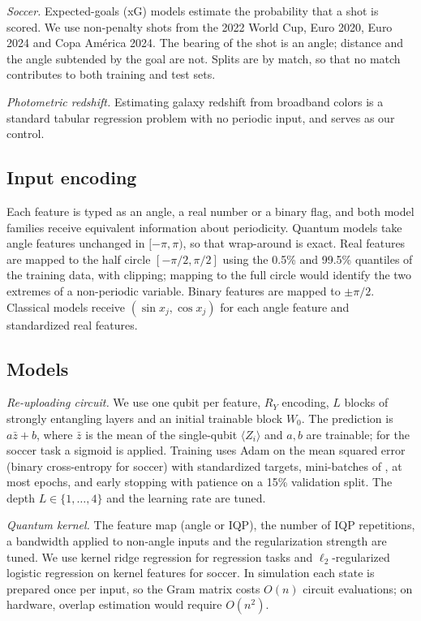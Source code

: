 \documentclass[11pt,letterpaper]{article}
\begin{document}
\emph{Soccer.} Expected-goals (xG) models estimate the probability that a shot is scored. We use
non-penalty shots from the 2022 World Cup, Euro 2020, Euro 2024 and Copa Am\'erica 2024. The
bearing of the shot is an angle; distance and the angle subtended by the goal are not. Splits
are by match, so that no match contributes to both training and test sets.

\emph{Photometric redshift.} Estimating galaxy redshift from broadband colors is a standard
tabular regression problem with no periodic input, and serves as our control.

\subsection{Input encoding}

Each feature is typed as an angle, a real number or a binary flag, and both model families
receive equivalent information about periodicity. Quantum models take angle features
unchanged in $[-\pi,\pi)$, so that wrap-around is exact. Real features are mapped to the half
circle $[-\pi/2,\pi/2]$ using the 0.5\% and 99.5\% quantiles of the training data, with
clipping; mapping to the full circle would identify the two extremes of a non-periodic
variable. Binary features are mapped to $\pm\pi/2$. Classical models receive
$(\sin x_j,\cos x_j)$ for each angle feature and standardized real features.

\subsection{Models}
\label{sec:models}

\emph{Re-uploading circuit.} We use one qubit per feature, $R_Y$ encoding, $L$ blocks of
strongly entangling layers and an initial trainable block $W_0$. The prediction is
$a\bar z + b$, where $\bar z$ is the mean of the single-qubit $\langle Z_i\rangle$ and $a,b$
are trainable; for the soccer task a sigmoid is applied. Training uses Adam on the mean
squared error (binary cross-entropy for soccer) with standardized targets, mini-batches of
\vqcBatch, at most \vqcEpochs{} epochs, and early stopping with patience \vqcPatience{} on a
15\% validation split. The depth $L\in\{1,\dots,4\}$ and the learning rate are tuned.

\emph{Quantum kernel.} The feature map (angle or IQP), the number of IQP repetitions, a
bandwidth applied to non-angle inputs and the regularization strength are tuned. We use kernel
ridge regression for regression tasks and $\ell_2$-regularized logistic regression on kernel
features for soccer. In simulation each state is prepared once per input, so the Gram matrix
costs $O(n)$ circuit evaluations; on hardware, overlap estimation would require $O(n^2)$.
\end{document}
